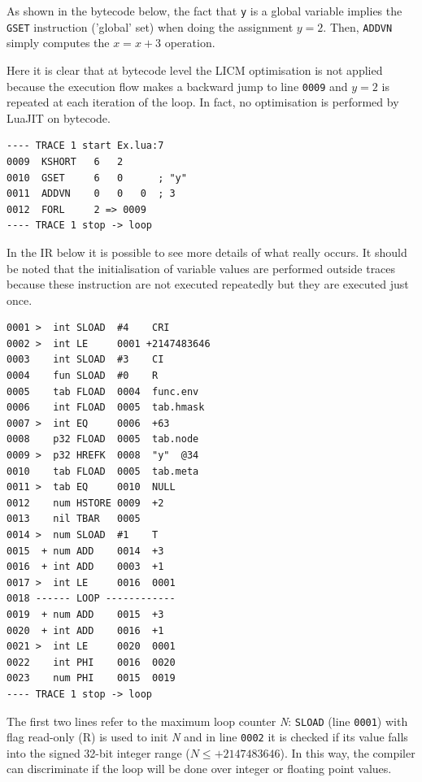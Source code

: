 \noindent
As shown in the bytecode below, the fact that \texttt{y} is a global variable implies the \texttt{GSET} instruction ('global' set) when doing the assignment $y=2$. Then, \texttt{ADDVN} simply computes the $x=x+3$ operation. 

Here it is clear that at bytecode level the LICM optimisation is not applied because the execution flow makes a backward jump to line \texttt{0009} and $y=2$ is repeated at each iteration of the loop. In fact, no optimisation is performed by LuaJIT on bytecode.

\begin{lstlisting}[style=DumpStyle]
---- TRACE 1 start Ex.lua:7
0009  KSHORT   6   2
0010  GSET     6   0      ; "y"
0011  ADDVN    0   0   0  ; 3
0012  FORL     2 => 0009
---- TRACE 1 stop -> loop
\end{lstlisting}

\noindent
In the IR below it is possible to see more details of what really occurs. It should be noted that the initialisation of variable values are performed outside traces because these instruction are not executed repeatedly but they are executed just once.

\begin{multicols}{2}
\begin{lstlisting}[style=DumpStyle]
0001 >  int SLOAD  #4    CRI
0002 >  int LE     0001 +2147483646
0003    int SLOAD  #3    CI
0004    fun SLOAD  #0    R
0005    tab FLOAD  0004  func.env
0006    int FLOAD  0005  tab.hmask
0007 >  int EQ     0006  +63 
0008    p32 FLOAD  0005  tab.node
0009 >  p32 HREFK  0008  "y"  @34
0010    tab FLOAD  0005  tab.meta
0011 >  tab EQ     0010  NULL
0012    num HSTORE 0009  +2  
0013    nil TBAR   0005
0014 >  num SLOAD  #1    T
0015  + num ADD    0014  +3  
0016  + int ADD    0003  +1  
0017 >  int LE     0016  0001
0018 ------ LOOP ------------
0019  + num ADD    0015  +3  
0020  + int ADD    0016  +1  
0021 >  int LE     0020  0001
0022    int PHI    0016  0020
0023    num PHI    0015  0019
---- TRACE 1 stop -> loop
\end{lstlisting}
\end{multicols} 

\noindent
The first two lines refer to the maximum loop counter \textit{N}: \texttt{SLOAD} (line \texttt{0001}) with flag read-only (R) is used to init \textit{N} and in line \texttt{0002} it is checked if its value falls into the signed 32-bit integer range ($N\leq+2147483646$). In this way, the compiler can discriminate if the loop will be done over integer or floating point values.

